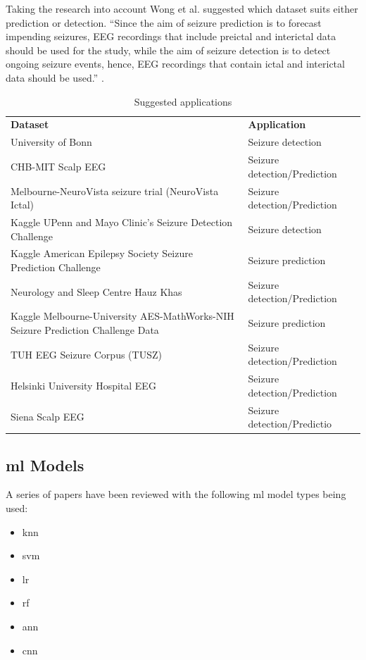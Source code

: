 \documentclass[12pt]{article}
\begin{document}
Taking the research into account Wong et al. suggested which dataset suits either prediction or detection. ``Since the aim of seizure prediction is to forecast impending seizures, EEG recordings that include preictal and interictal data should be used for the study, while the aim of seizure detection is to detect ongoing seizure events, hence, EEG recordings that contain ictal and interictal data should be used.'' \cite{wong2023eeg}.

\begin{table}[H]
\centering
\begin{tabular}{p{}p{}}
\textbf{Dataset}                     & \textbf{Application}         \\
University of Bonn                   & Seizure detection            \\
CHB-MIT Scalp EEG                    & Seizure detection/Prediction \\
Melbourne-NeuroVista seizure trial (NeuroVista Ictal)                           & Seizure detection/Prediction \\
Kaggle UPenn and Mayo Clinic's Seizure Detection Challenge                      & Seizure detection            \\
Kaggle American Epilepsy Society Seizure Prediction Challenge                   & Seizure prediction           \\
Neurology and Sleep Centre Hauz Khas & Seizure detection/Prediction \\
Kaggle Melbourne-University AES-MathWorks-NIH Seizure Prediction Challenge Data & Seizure prediction           \\
TUH EEG Seizure Corpus (TUSZ)        & Seizure detection/Prediction \\
Helsinki University Hospital EEG     & Seizure detection/Prediction \\
Siena Scalp EEG                      & Seizure detection/Predictio 
\end{tabular}
\caption{Suggested applications}
\end{table} 

\subsection{\acrfull{ml} Models}

A series of papers have been reviewed with the following \acrshort{ml} model types being used:

\begin{itemize}
	\item \acrfull{knn}
	\item \acrfull{svm}
	\item \acrfull{lr}
	\item \acrfull{rf}
	\item \acrfull{ann}
	\item \acrfull{cnn}
\end{itemize}
\end{document}
